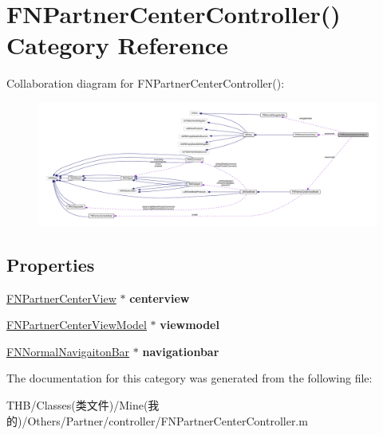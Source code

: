 \hypertarget{category_f_n_partner_center_controller_07_08}{}\section{F\+N\+Partner\+Center\+Controller() Category Reference}
\label{category_f_n_partner_center_controller_07_08}


Collaboration diagram for F\+N\+Partner\+Center\+Controller()\+:\nopagebreak
\begin{figure}[H]
\begin{center}
\leavevmode
\includegraphics[width=350pt]{category_f_n_partner_center_controller_07_08__coll__graph}
\end{center}
\end{figure}
\subsection*{Properties}
\begin{DoxyCompactItemize}
\item 
\mbox{\label{category_f_n_partner_center_controller_07_08_a4912d0d42c8b83c7da2b5dcbdc74e911}} 
\mbox{\hyperlink{interface_f_n_partner_center_view}{F\+N\+Partner\+Center\+View}} $\ast$ {\bfseries centerview}
\item 
\mbox{\label{category_f_n_partner_center_controller_07_08_a83a49d20565dc15fe5e795dd328af7a8}} 
\mbox{\hyperlink{interface_f_n_partner_center_view_model}{F\+N\+Partner\+Center\+View\+Model}} $\ast$ {\bfseries viewmodel}
\item 
\mbox{\label{category_f_n_partner_center_controller_07_08_af95afac37456ffeee03f5a8807b03443}} 
\mbox{\hyperlink{interface_f_n_normal_navigaiton_bar}{F\+N\+Normal\+Navigaiton\+Bar}} $\ast$ {\bfseries navigationbar}
\end{DoxyCompactItemize}


The documentation for this category was generated from the following file\+:\begin{DoxyCompactItemize}
\item 
T\+H\+B/\+Classes(类文件)/\+Mine(我的)/\+Others/\+Partner/controller/F\+N\+Partner\+Center\+Controller.\+m\end{DoxyCompactItemize}
